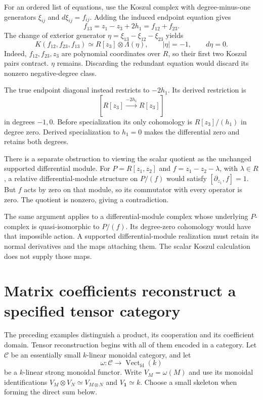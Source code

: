 For an ordered list of equations, use the Koszul complex with
degree-minus-one generators $\xi_{ij}$ and
$d\xi_{ij}=f_{ij}$.
Adding the induced endpoint equation gives
\[
 f_{13}=z_1-z_3+2h_1=f_{12}+f_{23}.
\]
The change of exterior generator
$\eta=\xi_{13}-\xi_{12}-\xi_{23}$ yields
\begin{equation}\label{eq:vol2-shifted-excess}
 K(f_{12},f_{23},f_{13})
 \simeq R[z_3]\otimes\Lambda(\eta),
 \qquad |\eta|=-1,\qquad d\eta=0.
\end{equation}
Indeed, $f_{12},f_{23},z_3$ are polynomial coordinates over $R$,
so their first two Koszul pairs contract. $\eta$ remains.
Discarding the redundant equation would discard its nonzero
negative-degree class.

The true endpoint diagonal instead restricts to $-2h_1$.
Its derived restriction is
\[
 [R[z_3]\xrightarrow{-2h_1}R[z_3]]
\]
in degrees $-1,0$.
Before specialization its only cohomology is $R[z_3]/(h_1)$
in degree zero.
Derived specialization to $h_1=0$ makes the differential zero and
retains both degrees.

There is a separate obstruction to viewing the scalar quotient as
the unchanged supported differential module.
For $P=R[z_1,z_2]$ and $f=z_1-z_2-\lambda$, with
$\lambda\in R$, a relative differential-module structure on
$P/(f)$ would satisfy $[\partial_{z_1},f]=1$.
But $f$ acts by zero on that module, so its commutator with every
operator is zero.
The quotient is nonzero, giving a contradiction.

The same argument applies to a differential-module complex whose
underlying $P$-complex is quasi-isomorphic to $P/(f)$.
Its degree-zero cohomology would have that impossible action.
A supported differential-module realization must retain its normal
derivatives and the maps attaching them.
The scalar Koszul calculation does not supply those maps.

\section{Matrix coefficients reconstruct a specified tensor category}

The preceding examples distinguish a product, its cooperation and
its coefficient domain.
Tensor reconstruction begins with all of them encoded in a category.
Let $\mathcal C$ be an essentially small $k$-linear monoidal category,
and let
\[
 \omega:\mathcal C\longrightarrow\operatorname{Vect}_{\mathrm{fd}}(k)
\]
be a $k$-linear strong monoidal functor.
Write $V_M=\omega(M)$ and use its monoidal identifications
$V_M\otimes V_N\simeq V_{M\otimes N}$ and $V_{\mathbf1}\simeq k$.
Choose a small skeleton when forming the direct sum below.

